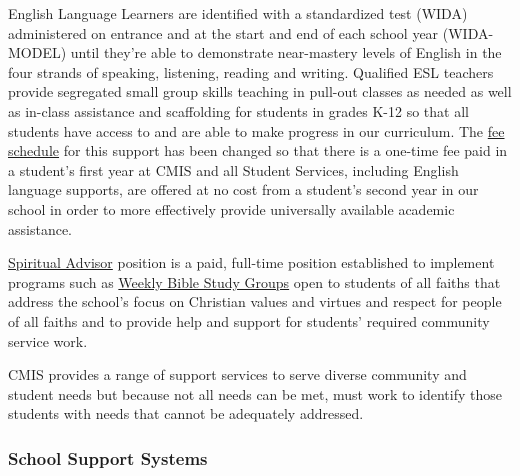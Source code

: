 \begin{findings}
English Language Learners are identified with a standardized test (WIDA) administered on entrance and at the start and end of each school year (WIDA-MODEL) until they’re able to demonstrate near-mastery levels of English in the four strands of speaking, listening, reading and writing.  Qualified ESL teachers provide segregated small group skills teaching in pull-out classes as needed as well as in-class assistance and scaffolding for students in grades K-12 so that all students have access to and are able to make progress in our curriculum. The \href{https://docs.google.com/document/d/1j2Z1tLgRgfX9CH3dzoYtU_GOhPOVWKPl6iFlvWqd6wM/edit}{fee schedule} for this support has been changed so that there is a one-time fee paid in a student’s first year at CMIS and all Student Services, including English language supports, are offered at no cost from a student’s second year in our school in order to more effectively provide universally available academic assistance. 

\href{http://blogs.cmis.ac.th/eagles/faith-service/spiritual-life/}{Spiritual Advisor} position is a paid, full-time position established to implement programs such as \href{http://blogs.cmis.ac.th/eagles/faith-service/spiritual-life/}{Weekly Bible Study Groups} open to students of all faiths that address the school’s focus on Christian values and virtues and respect for people of all faiths and to provide help and support for students’ required community service work.


CMIS provides a range of support services to serve diverse community and student needs but because not all needs can be met, must work to identify those students with needs that cannot be adequately addressed.
\end{findings}

\subsubsection{School Support Systems}



